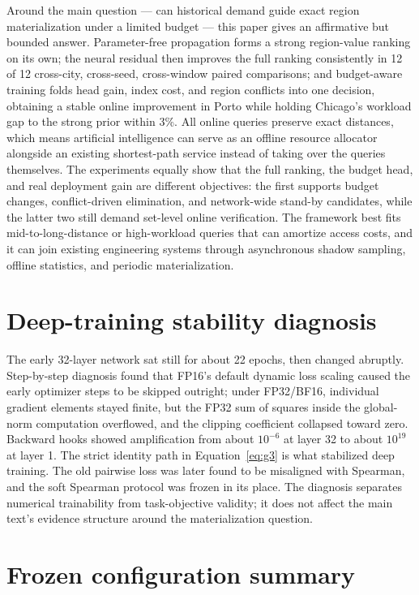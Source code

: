 \documentclass[5p,twocolumn,authoryear]{elsarticle}
\begin{document}
Around the main question --- can historical demand guide exact region materialization
under a limited budget --- this paper gives an affirmative but bounded answer.
Parameter-free propagation forms a strong region-value ranking on its own; the neural
residual then improves the full ranking consistently in 12 of 12 cross-city, cross-seed,
cross-window paired comparisons; and budget-aware training folds head gain, index cost,
and region conflicts into one decision, obtaining a stable online improvement in Porto
while holding Chicago's workload gap to the strong prior within 3\%. All online queries
preserve exact distances, which means artificial intelligence can serve as an offline
resource allocator alongside an existing shortest-path service instead of taking over the
queries themselves. The experiments equally show that the full ranking, the budget head,
and real deployment gain are different objectives: the first supports budget changes,
conflict-driven elimination, and network-wide stand-by candidates, while the latter two
still demand set-level online verification. The framework best fits mid-to-long-distance
or high-workload queries that can amortize access costs, and it can join existing
engineering systems through asynchronous shadow sampling, offline statistics, and periodic
materialization.

\appendix

\section{Deep-training stability diagnosis}

The early 32-layer network sat still for about 22 epochs, then changed abruptly.
Step-by-step diagnosis found that FP16's default dynamic loss scaling caused the early
optimizer steps to be skipped outright; under FP32/BF16, individual gradient elements
stayed finite, but the FP32 sum of squares inside the global-norm computation overflowed,
and the clipping coefficient collapsed toward zero. Backward hooks showed amplification
from about $10^{-6}$ at layer 32 to about $10^{19}$ at layer 1. The strict identity path
in Equation~\eqref{eq:g3} is what stabilized deep training. The old pairwise loss was
later found to be misaligned with Spearman, and the soft Spearman protocol was frozen in
its place. The diagnosis separates numerical trainability from task-objective validity; it
does not affect the main text's evidence structure around the materialization question.

\section{Frozen configuration summary}
\end{document}
